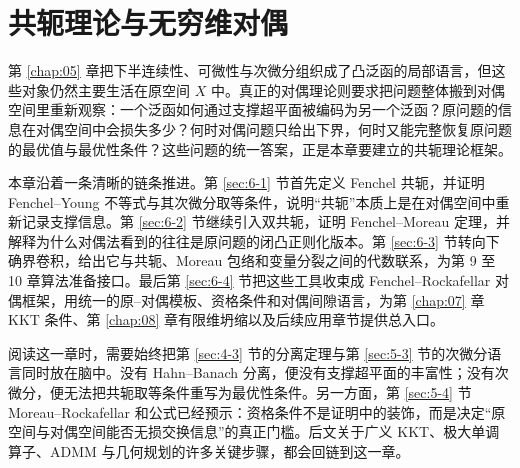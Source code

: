 \chapter{共轭理论与无穷维对偶}

\label{chap:06}

第 \ref{chap:05} 章把下半连续性、可微性与次微分组织成了凸泛函的局部语言，但这些对象仍然主要生活在原空间 $X$ 中。真正的对偶理论则要求把问题整体搬到对偶空间里重新观察：一个泛函如何通过支撑超平面被编码为另一个泛函？原问题的信息在对偶空间中会损失多少？何时对偶问题只给出下界，何时又能完整恢复原问题的最优值与最优性条件？这些问题的统一答案，正是本章要建立的共轭理论框架。

本章沿着一条清晰的链条推进。第 \ref{sec:6-1} 节首先定义 Fenchel 共轭，并证明 Fenchel--Young 不等式与其次微分取等条件，说明“共轭”本质上是在对偶空间中重新记录支撑信息。第 \ref{sec:6-2} 节继续引入双共轭，证明 Fenchel--Moreau 定理，并解释为什么对偶法看到的往往是原问题的闭凸正则化版本。第 \ref{sec:6-3} 节转向下确界卷积，给出它与共轭、Moreau 包络和变量分裂之间的代数联系，为第 9 至 10 章算法准备接口。最后第 \ref{sec:6-4} 节把这些工具收束成 Fenchel--Rockafellar 对偶框架，用统一的原--对偶模板、资格条件和对偶间隙语言，为第 \ref{chap:07} 章 KKT 条件、第 \ref{chap:08} 章有限维坍缩以及后续应用章节提供总入口。

阅读这一章时，需要始终把第 \ref{sec:4-3} 节的分离定理与第 \ref{sec:5-3} 节的次微分语言同时放在脑中。没有 Hahn--Banach 分离，便没有支撑超平面的丰富性；没有次微分，便无法把共轭取等条件重写为最优性条件。另一方面，第 \ref{sec:5-4} 节 Moreau--Rockafellar 和公式已经预示：资格条件不是证明中的装饰，而是决定“原空间与对偶空间能否无损交换信息”的真正门槛。后文关于广义 KKT、极大单调算子、ADMM 与几何规划的许多关键步骤，都会回链到这一章。








